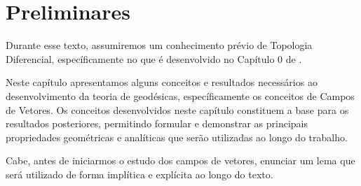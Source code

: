 
\chapter{Preliminares}
\label{cap:preliminares}

Durante esse texto, assumiremos um conhecimento prévio de Topologia Diferencial, específicamente no que é desenvolvido no Capítulo 0 de \textcite{doCarmo1992}.

Neste capítulo apresentamos alguns conceitos e resultados necessários ao desenvolvimento da teoria de geodésicas, específicamente os conceitos de Campos de Vetores. Os conceitos desenvolvidos neste capítulo constituem a base para os resultados posteriores, permitindo formular e demonstrar as principais propriedades geométricas e analíticas que serão utilizadas ao longo do trabalho.

Cabe, antes de iniciarmos o estudo dos campos de vetores, enunciar um lema que será utilizado de forma implítica e explícita ao longo do texto.



\iffalse
